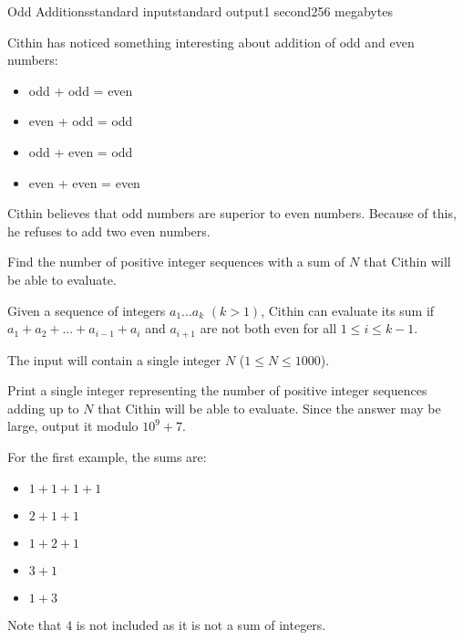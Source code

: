 \begin{problem}{Odd Additions}{standard input}{standard output}{1 second}{256 megabytes}

Cithin has noticed something interesting about addition of odd and even numbers:
\begin{itemize}
\item odd + odd = even
\item even + odd = odd
\item odd + even = odd
\item even + even = even
\end{itemize}
Cithin believes that odd numbers are superior to even numbers. Because of this, he refuses to add two even numbers. 

Find the number of positive integer sequences with a sum of $N$ that Cithin will be able to evaluate. 

Given a sequence of integers $a_{1}...a_{k}$ $(k > 1)$, Cithin can evaluate its sum if $a_{1} + a_{2} + ... + a_{i-1} + a_{i}$ and $a_{i+1}$ are not both even for all $1 \leq i \leq k - 1$.

\InputFile
The input will contain a single integer $N$ ($1 \leq N \leq 1000$).

\OutputFile
Print a single integer representing the number of positive integer sequences adding up to $N$ that Cithin will be able to evaluate. Since the answer may be large, output it modulo $10^9 + 7$.

\Examples

\begin{example}
%
%
\end{example}

\Note
For the first example, the sums are:
\begin{itemize}
\item $1 + 1 + 1 + 1$
\item $2 + 1 + 1$
\item $1 + 2 + 1$
\item $3 + 1$
\item $1 + 3$
\end{itemize}
Note that $4$ is not included as it is not a sum of integers.

\end{problem}
